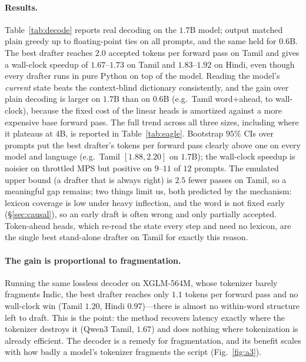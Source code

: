 \paragraph{Results.} Table~\ref{tab:decode} reports real decoding on the
$1.7$B model; output matched plain greedy up to floating-point ties on all
prompts, and the same held for $0.6$B. The best drafter reaches $2.0$ accepted tokens per forward pass
on Tamil and gives a wall-clock speedup of \x$1.67$--\x$1.73$ on Tamil and
\x$1.83$--\x$1.92$ on Hindi, even though every drafter runs in pure Python on
top of the model. Reading the model's \emph{current} state beats the
context-blind dictionary consistently, and the gain over plain decoding is
larger on $1.7$B than on $0.6$B (e.g.\ Tamil word+ahead,  to 
wall-clock), because the fixed cost of the linear heads is amortized against a
more expensive base forward pass. The full trend across all three sizes,
including where it plateaus at $4$B, is reported in Table~\ref{tab:eagle}.
Bootstrap $95\%$ CIs over prompts put the best drafter's tokens per forward pass
clearly above one on every model and language (e.g.\ Tamil $[1.88,2.20]$ on
$1.7$B); the wall-clock speedup is noisier on throttled MPS but positive on
$9$--$11$ of $12$ prompts.
The emulated upper bound (a drafter that is always right) is \x$2.5$ fewer
passes on Tamil, so a meaningful gap remains; two things limit us, both
predicted by the mechanism: lexicon coverage is low under heavy inflection, and
the word is not fixed early (\S\ref{sec:causal}), so an early draft is often
wrong and only partially accepted. Token-ahead heads, which re-read the state
every step and need no lexicon, are the single best stand-alone drafter on
Tamil for exactly this reason.

\paragraph{The gain is proportional to fragmentation.} Running the same lossless
decoder on XGLM-564M, whose tokenizer barely fragments Indic, the best drafter
reaches only $1.1$ tokens per forward pass and no wall-clock win (Tamil
\x$1.20$, Hindi \x$0.97$)---there is almost no within-word structure left to
draft. This is the point: the method recovers latency exactly where the
tokenizer destroys it (Qwen3 Tamil, \x$1.67$) and does nothing where
tokenization is already efficient. The decoder is a remedy for fragmentation,
and its benefit scales with how badly a model's tokenizer fragments the script
(Fig.~\ref{fig:a3}).

